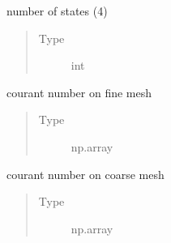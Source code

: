 \documentclass[letterpaper,10pt,english]{sphinxmanual}
\begin{document}
\begin{fulllineitems}
\begin{fulllineitems}
\begin{quote}
\begin{description}
\end{description}\end{quote}

\end{fulllineitems}


\begin{fulllineitems}
\label{\detokenize{autoapi/NavierStokes/index:NavierStokes.NavierStokes.dimensions}}
\sphinxAtStartPar
number of states (4)
\begin{quote}\begin{description}
\item[{Type}] \leavevmode
\sphinxAtStartPar
int

\end{description}\end{quote}

\end{fulllineitems}


\begin{fulllineitems}
\label{\detokenize{autoapi/NavierStokes/index:NavierStokes.NavierStokes.cfl_fine}}
\sphinxAtStartPar
courant number on fine mesh
\begin{quote}\begin{description}
\item[{Type}] \leavevmode
\sphinxAtStartPar
np.array

\end{description}\end{quote}

\end{fulllineitems}


\begin{fulllineitems}
\label{\detokenize{autoapi/NavierStokes/index:NavierStokes.NavierStokes.cfl_coarse}}
\sphinxAtStartPar
courant number on coarse mesh
\begin{quote}\begin{description}
\item[{Type}] \leavevmode
\sphinxAtStartPar
np.array


\end{description}
\end{quote}
\end{fulllineitems}
\end{fulllineitems}
\end{document}
